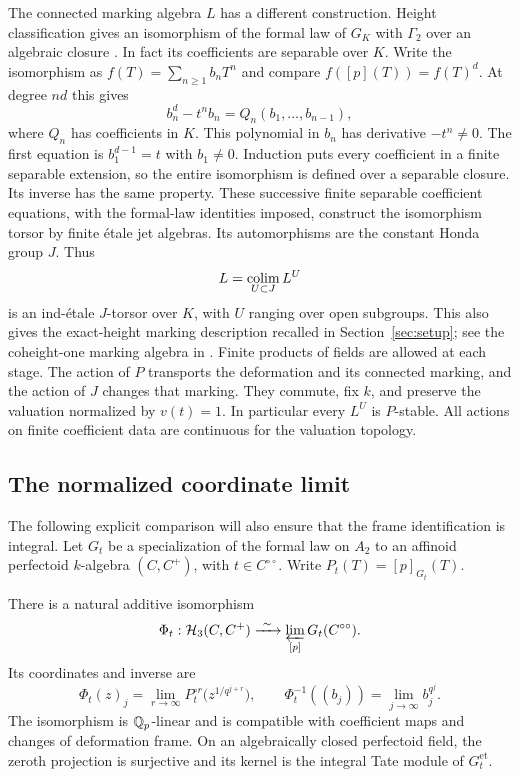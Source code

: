 The connected marking algebra $L$ has a different construction.
Height classification gives an isomorphism of the formal law of
$G_K$ with $\Gamma_2$ over an algebraic closure
\cite[Theorem~IV]{Lazard55}.  In fact its coefficients are separable
over $K$.  Write the isomorphism as $f(T)=\sum_{n\geq1}b_nT^n$
and compare $f([p](T))=f(T)^d$.  At degree $nd$ this gives
\[
 b_n^d-t^n b_n=Q_n(b_1,\ldots,b_{n-1}),
\]
where $Q_n$ has coefficients in $K$.  This polynomial in $b_n$
has derivative $-t^n\ne0$.  The first equation is
$b_1^{d-1}=t$ with $b_1\ne0$.  Induction puts every coefficient
in a finite separable extension, so the entire isomorphism is
defined over a separable closure.  Its inverse has the same
property.  These successive finite separable coefficient equations,
with the formal-law identities imposed, construct the isomorphism
torsor by finite étale jet algebras.  Its automorphisms are the
constant Honda group $J$.  Thus
\[
 L=\operatorname*{colim}_{U\subset J}L^U
\]
is an ind-étale $J$-torsor over $K$, with $U$ ranging over open subgroups.
This also gives the exact-height marking description recalled in
Section~\ref{sec:setup}; see the coheight-one marking
algebra in \cite[Section~2.7]{BMR26}.  Finite products of fields are
allowed at each stage.  The action of $P$ transports the deformation and
its connected marking, and the action of $J$ changes that marking.
They commute, fix $k$, and preserve the valuation normalized by $v(t)=1$.
In particular every $L^U$ is $P$-stable.  All actions on finite
coefficient data are continuous for the valuation topology.

\subsection{The normalized coordinate limit}

The following explicit comparison will also ensure that the frame
identification is integral.  Let $G_t$ be a specialization of the formal
law on $A_2$ to an affinoid perfectoid $k$-algebra $(C,C^+)$, with
$t\in C^{\circ\circ}$.  Write $P_t(T)=[p]_{G_t}(T)$.

\begin{lemma}
\label{lem:cover-coordinates}
There is a natural additive isomorphism
\[
 \Phi_t:\mathcal H_3(C,C^+)\xrightarrow{\ \sim\ }
 \varprojlim_{[p]}G_t(C^{\circ\circ}).
\]
Its coordinates and inverse are
\begin{equation}
 \Phi_t(z)_j=\lim_{r\longrightarrow\infty}
      P_t^{\circ r}\bigl(z^{1/q^{j+r}}\bigr),
 \qquad
 \Phi_t^{-1}((b_j))=\lim_{j\longrightarrow\infty}b_j^{q^j}.
 \label{eq:cover-limit}
\end{equation}
The isomorphism is $\mathbb Q_p$-linear and is compatible with coefficient
maps and changes of deformation frame.  On an algebraically closed
perfectoid field, the zeroth projection is surjective and its kernel
is the integral Tate module of $G_t^{\mathrm{et}}$.
\end{lemma}

